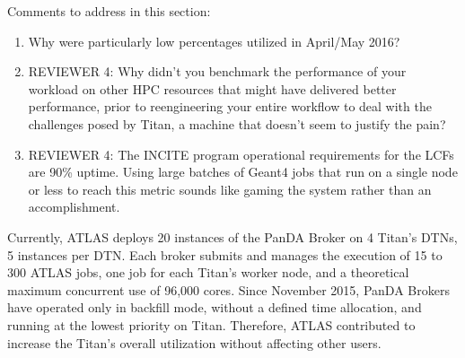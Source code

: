 \ifreview
Comments to address in this section:
\begin{enumerate}
    \item 
    Why were particularly low percentages utilized in April/May 2016?
    \item REVIEWER 4: Why didn’t you benchmark the performance of your
    workload on other HPC resources that might have delivered better
    performance, prior to reengineering your entire workflow to deal with the
    challenges posed by Titan, a machine that doesn’t seem to justify the
    pain?
    \item REVIEWER 4: The INCITE program operational requirements for the
    LCFs are 90\% uptime. Using large batches of Geant4 jobs that run on a
    single node or less to reach this metric sounds like gaming the system
    rather than an accomplishment.
\end{enumerate}
\fi

Currently, ATLAS deploys 20 instances of the PanDA Broker on 4 Titan's DTNs,
5 instances per DTN\@. Each broker submits and manages the execution of 15 to
300 ATLAS jobs, one job for each Titan's worker node, and a theoretical
maximum concurrent use of 96,000 cores. Since November 2015, PanDA Brokers
have operated only in backfill mode, without a defined time allocation, and
running at the lowest priority on Titan. Therefore, ATLAS contributed to
increase the Titan's overall utilization without affecting other users.

